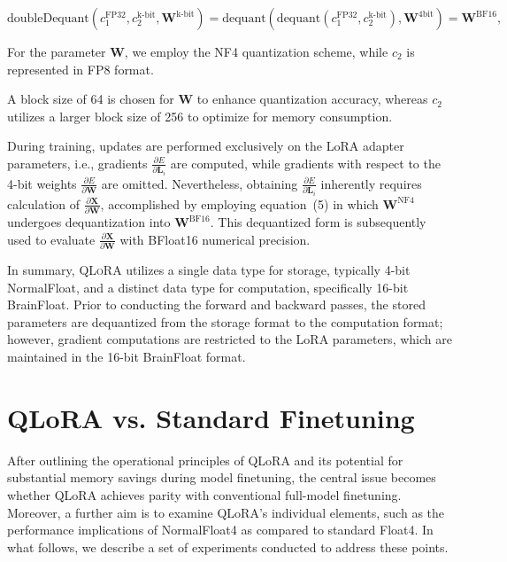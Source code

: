 \begin{equation}
    \text{doubleDequant}(c_1^{\text{FP32}}, c_2^{\text{k-bit}}, \mathbf{W}^{\text{k-bit}}) = \text{dequant}(\text{dequant}(c_1^{\text{FP32}}, c_2^{\text{k-bit}}), \mathbf{W}^{\text{4bit}}) = \mathbf{W}^{\text{BF16}},
\end{equation}

For the parameter $\mathbf{W}$, we employ the NF4 quantization scheme, while $c_2$ is represented in FP8 format.

A block size of 64 is chosen for $\mathbf{W}$ to enhance quantization accuracy, whereas $c_2$ utilizes a larger block size of 256 to optimize for memory consumption.

During training, updates are performed exclusively on the LoRA adapter parameters, i.e., gradients $\frac{\partial E}{\partial \mathbf{L}_i}$ are computed, while gradients with respect to the 4-bit weights $\frac{\partial E}{\partial \mathbf{W}}$ are omitted. Nevertheless, obtaining $\frac{\partial E}{\partial \mathbf{L}_i}$ inherently requires calculation of $\frac{\partial \mathbf{X}}{\partial \mathbf{W}}$, accomplished by employing equation~(5) in which $\mathbf{W}^{\text{NF4}}$ undergoes dequantization into $\mathbf{W}^{\text{BF16}}$. This dequantized form is subsequently used to evaluate $\frac{\partial \mathbf{X}}{\partial \mathbf{W}}$ with BFloat16 numerical precision.

In summary, \textsc{QLoRA} utilizes a single data type for storage, typically 4-bit NormalFloat, and a distinct data type for computation, specifically 16-bit BrainFloat. Prior to conducting the forward and backward passes, the stored parameters are dequantized from the storage format to the computation format; however, gradient computations are restricted to the LoRA parameters, which are maintained in the 16-bit BrainFloat format.

\section{QLoRA vs. Standard Finetuning}
\label{sec:comp_to_std}

After outlining the operational principles of QLoRA and its potential for substantial memory savings during model finetuning, the central issue becomes whether QLoRA achieves parity with conventional full-model finetuning. Moreover, a further aim is to examine QLoRA’s individual elements, such as the performance implications of NormalFloat4 as compared to standard Float4. In what follows, we describe a set of experiments conducted to address these points.

